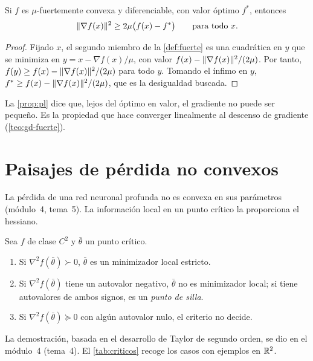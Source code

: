 \begin{proposicion}\label{prop:pl}
Si $f$ es $\mu$-fuertemente convexa y diferenciable, con valor óptimo $f^{\ast}$, entonces
\[
\lVert\nabla f(x)\rVert^{2}\ge 2\mu\bigl(f(x)-f^{\ast}\bigr)\qquad\text{para todo } x.
\]
\end{proposicion}

\begin{proof}
Fijado $x$, el segundo miembro de la \cref{def:fuerte} es una cuadrática en $y$ que se minimiza en $y=x-\nabla f(x)/\mu$, con valor $f(x)-\lVert\nabla f(x)\rVert^{2}/(2\mu)$. Por tanto, $f(y)\ge f(x)-\lVert\nabla f(x)\rVert^{2}/(2\mu)$ para todo $y$. Tomando el ínfimo en $y$, $f^{\ast}\ge f(x)-\lVert\nabla f(x)\rVert^{2}/(2\mu)$, que es la desigualdad buscada.
\end{proof}

La \cref{prop:pl} dice que, lejos del óptimo en valor, el gradiente no puede ser pequeño. Es la propiedad que hace converger linealmente al descenso de gradiente (\cref{teo:gd-fuerte}).

\section{Paisajes de pérdida no convexos}

La pérdida de una red neuronal profunda no es convexa en sus parámetros (módulo~4, tema~5). La información local en un punto crítico la proporciona el hessiano.

\begin{proposicion}\label{prop:clasificacion}
Sea $f$ de clase $C^{2}$ y $\bar\theta$ un punto crítico.
\begin{enumerate}
  \item Si $\nabla^{2}f(\bar\theta)\succ 0$, $\bar\theta$ es un minimizador local estricto.
  \item Si $\nabla^{2}f(\bar\theta)$ tiene un autovalor negativo, $\bar\theta$ no es minimizador local; si tiene autovalores de ambos signos, es un \emph{punto de silla}.
  \item Si $\nabla^{2}f(\bar\theta)\succeq 0$ con algún autovalor nulo, el criterio no decide.
\end{enumerate}
\end{proposicion}

La demostración, basada en el desarrollo de Taylor de segundo orden, se dio en el módulo~4 (tema~4). El \cref{tab:criticos} recoge los casos con ejemplos en $\mathbb{R}^{2}$.

